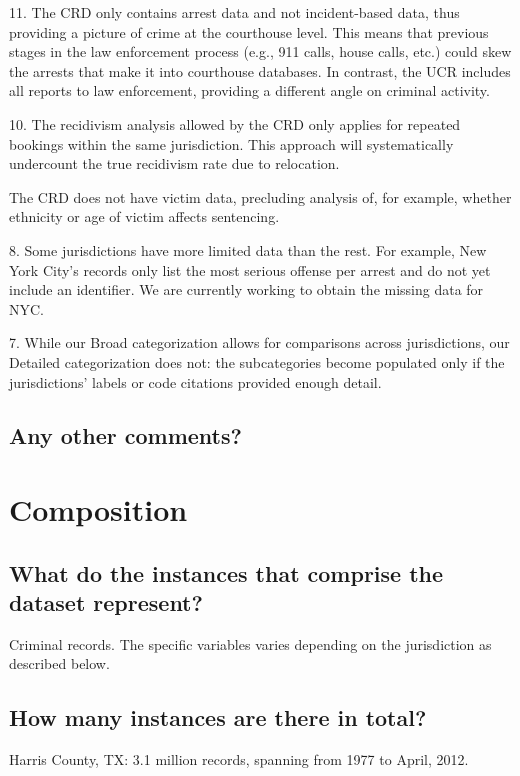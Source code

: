 \documentclass[letterpaper, 10 pt, conference]{ieeeconf}  %
\begin{document}
11. The CRD only contains arrest data and not incident-based data, thus providing a picture of crime at the courthouse level. This means that previous stages in the
law enforcement process (e.g., 911 calls, house calls, etc.) could skew the arrests that make it into courthouse databases. In contrast, the UCR includes all
reports to law enforcement, providing a different angle
on criminal activity. 

10. The recidivism analysis allowed by the CRD only
applies for repeated bookings within the same
jurisdiction. This approach will systematically
undercount the true recidivism rate due to relocation.

The CRD does not have victim data, precluding
analysis of, for example, whether ethnicity or age of
victim affects sentencing.

8. Some jurisdictions have more limited data than the
rest. For example, New York City’s records only list the
most serious offense per arrest and do not yet include
an identifier. We are currently working to obtain the
missing data for NYC.

7. While our Broad categorization allows for
comparisons across jurisdictions, our Detailed
categorization does not: the subcategories become
populated only if the jurisdictions’ labels or code
citations provided enough detail.




\subsection{Any other comments?}


\section{Composition}

\subsection{What do the instances that comprise the dataset represent?}

Criminal records. The specific variables varies depending on the jurisdiction as described below.

\subsection{How many instances are there in total?}

Harris County, TX: 3.1 million records, spanning from 1977 to April, 2012. 
\end{document}
